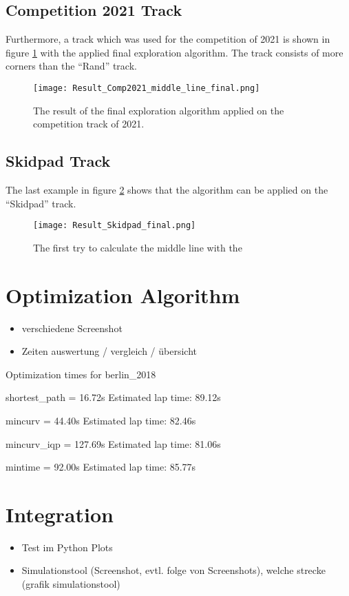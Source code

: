 \subsection{Competition 2021 Track} \label{sec:Results Competition 2021 Track}
Furthermore, a track which was used for the competition of 2021 is shown in figure \ref{fig:Result final middle line 2021 competition track} with the applied final exploration algorithm. The track consists of more corners than the ``Rand'' track.
\begin{figure}[H]
    \centering
    \texttt{[image: Result\_Comp2021\_middle\_line\_final.png]}
    \caption{The result of the final exploration algorithm applied on the competition track of 2021.}
    \label{fig:Result final middle line 2021 competition track}
\end{figure}

\subsection{Skidpad Track} \label{sec:Results Skidpad Track}
The last example in figure \ref{fig:Result final middle line skidpad track} shows that the algorithm can be applied on the ``Skidpad'' track.
\begin{figure}[H]
    \centering
    \texttt{[image: Result\_Skidpad\_final.png]}
    \caption{The first try to calculate the middle line with the }
    \label{fig:Result final middle line skidpad track}
\end{figure}

\section{Optimization Algorithm}
\begin{itemize}
    \item verschiedene Screenshot
    \item Zeiten auswertung / vergleich / übersicht
\end{itemize}
Optimization times for berlin\_2018

shortest\_path = 16.72s
Estimated lap time: 89.12s

mincurv = 44.40s
Estimated lap time: 82.46s

mincurv\_iqp = 127.69s
Estimated lap time: 81.06s

mintime = 92.00s
Estimated lap time: 85.77s

\section{Integration}
\begin{itemize}
    \item Test im Python Plots
    \item Simulationstool (Screenshot, evtl. folge von Screenshots), welche strecke (grafik simulationstool)
\end{itemize}

